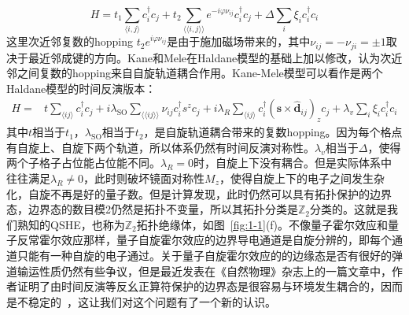 \begin{equation}
    \label{eq:1-3}
    H=t_{1} \sum_{\langle i, j\rangle} c_{i}^{\dagger} c_{j}+t_{2} \sum_{\langle\langle i, j\rangle\rangle} e^{-i \varphi \nu_{ij}} c_{i}^{\dagger} c_{j}+\Delta \sum_{i}\xi_{i} c_{i}^{\dagger} c_{i}
\end{equation}
这里次近邻复数的hopping  $t_2 e^{i\varphi \nu_{ij} }$是由于施加磁场带来的，其中$\nu_{ij}=-\nu_{ji}=\pm 1$取决于最近邻成键的方向。Kane和Mele在Haldane模型的基础上加以修改，认为次近邻之间复数的hopping来自自旋轨道耦合作用\citep{Kane2005,kane2}。Kane-Mele模型可以看作是两个Haldane模型的时间反演版本：
\begin{equation}
    \label{eq:1-4}
    \begin{aligned}
    H=& t \sum_{\langle i j\rangle} c_{i}^{\dagger} c_{j}+i \lambda_{\mathrm{SO}} \sum_{\langle\langle i j\rangle\rangle} \nu_{i j} c_{i}^{\dagger} s^{z} c_{j}+i \lambda_{R} \sum_{\langle i j\rangle} c_{i}^{\dagger}\left(\mathbf{s} \times \hat{\mathbf{d}}_{i j}\right)_{z} c_{j}+\lambda_{v} \sum_{i} \xi_{i} c_{i}^{\dagger} c_{i}
    \end{aligned}
\end{equation}
其中$t$相当于$t_1$，$\lambda_{\mathrm{SO}}$相当于$t_2$，是自旋轨道耦合带来的复数hopping。因为每个格点有自旋上、自旋下两个轨道，所以体系仍然有时间反演对称性。$\lambda_{v}$相当于$\Delta$，使得两个子格子占位能占位能不同。$\lambda_{R}= 0$时，自旋上下没有耦合。但是实际体系中往往满足$\lambda_{R}\neq 0$，此时则破坏镜面对称性$M_z$，使得自旋上下的电子之间发生杂化，自旋不再是好的量子数。但是计算发现，此时仍然可以具有拓扑保护的边界态，边界态的数目模2仍然是拓扑不变量，所以其拓扑分类是$\mathbb{Z}_2$分类的\citep{kane2}。这就是我们熟知的QSHE，也称为$\mathbb{Z}_2$拓扑绝缘体，如图~\ref{fig:1-1}(f)。不像量子霍尔效应和量子反常霍尔效应那样，量子自旋霍尔效应的边界导电通道是自旋分辨的，即每个通道只能有一种自旋的电子通过。关于量子自旋霍尔效应的的边缘态是否有很好的弹道输运性质仍然有些争议，但是最近发表在《自然物理》杂志上的一篇文章中，作者证明了由时间反演等反幺正算符保护的边界态是很容易与环境发生耦合的，因而是不稳定的~\citep{2020Fragility}，这让我们对这个问题有了一个新的认识。

